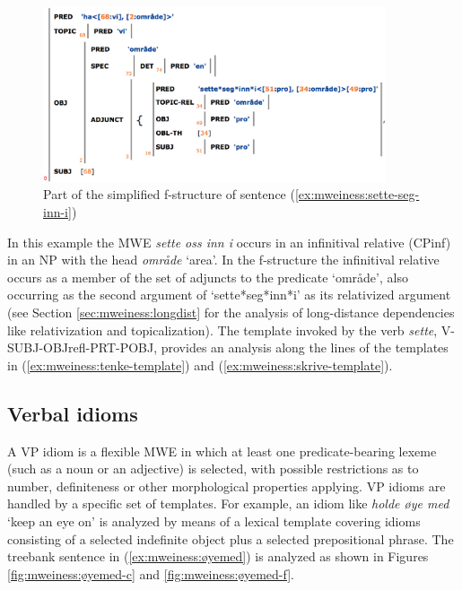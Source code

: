 \documentclass[output=paper]{langsci/langscibook}
\begin{document}
\begin{figure}
  \includegraphics[width=0.9\textwidth]{figures/sette-seg-inn-i-f.png}
  \caption{Part of the simplified f-structure of sentence (\ref{ex:mweiness:sette-seg-inn-i})}
  \label{fig:mweiness:sette-seg-inn-i-f}
\end{figure}

In this example the MWE  \textit{sette oss inn i} occurs in an infinitival relative (CPinf) in an NP with the head \textit{område} `area'.
In the f-structure the infinitival relative occurs as a member of the set of adjuncts to the predicate `område', also occurring as the second argument of `sette*seg*inn*i' as its relativized argument (see Section \ref{sec:mweiness:longdist} for the analysis of long-distance dependencies like relativization and topicalization).
The template invoked by the verb \textit{sette}, V-SUBJ-OBJrefl-PRT-POBJ, provides an analysis along the lines of the templates in (\ref{ex:mweiness:tenke-template}) and (\ref{ex:mweiness:skrive-template}).

\subsection{Verbal idioms}\label{sec:mweiness:verbalidioms}

A VP idiom is a flexible MWE in which at least one predicate-bearing lexeme (such as a noun or an adjective) is selected, with possible restrictions as to number, definiteness or other morphological properties applying.
VP idioms are handled by a specific set of templates.
For example, an idiom like \textit{holde øye med} `keep an eye on' is analyzed by means of a lexical template covering idioms consisting of a selected indefinite object plus a selected prepositional phrase.
The treebank sentence in (\ref{ex:mweiness:øyemed}) is analyzed as shown in Figures \ref{fig:mweiness:øyemed-c} and \ref{fig:mweiness:øyemed-f}.
\end{document}
